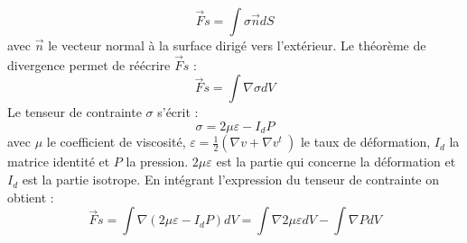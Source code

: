 \documentclass{article}
\begin{document}
\begin{equation}
\vec{F}s = \int \sigma \vec{n} dS 
\end{equation}
avec $\vec{n}$ le vecteur normal à la surface dirigé vers l'extérieur.
Le théorème de divergence permet de réécrire $\vec{F}s$ :
\begin{equation}
\vec{F}s = \int \nabla \sigma dV 
\end{equation}
Le tenseur de contrainte $\sigma$ s'écrit : 
\begin{equation}
\sigma = 2 \mu \varepsilon - I_{d}P
\end{equation}
avec $\mu$ le coefficient de viscosité, $\varepsilon = \frac{1}{2}( \nabla v + \nabla v^t\ ) $ le taux de déformation, $I_{d}$ la matrice identité et $P$ la pression.  $2\mu \varepsilon$ est la partie qui concerne la déformation et $I_{d}$ est la partie isotrope. En intégrant l'expression du tenseur de contrainte on obtient :
\begin{equation}
\vec{F}s = \int \nabla(2 \mu \varepsilon - I_{d}P ) dV =  \int \nabla 2 \mu \varepsilon dV - \int \nabla P dV
\end{equation}
\end{document}
